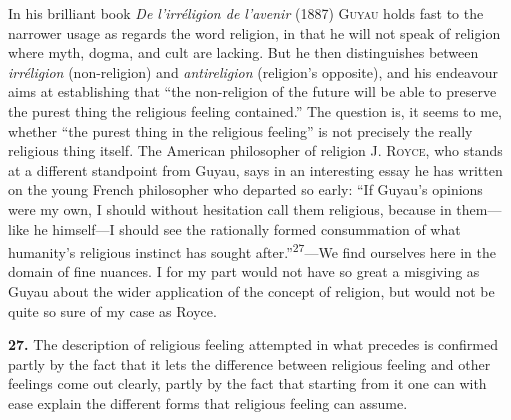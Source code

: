 \documentclass[12pt,a4paper]{book}
\newcommand{\opage}[1]{\marginnote{\footnotesize\textit{[#1]}}}
\begin{document}
In his brilliant book \emph{De l'irréligion de l'avenir} (1887) \textsc{Guyau}
holds fast to the narrower usage as regards the word religion, in that he will
not speak of religion where myth, dogma, and cult are lacking. But he then
distinguishes between \emph{irréligion} (non-religion) and \emph{antireligion}
(religion's opposite), and his endeavour aims at establishing that ``the
non-religion of the future will be able to preserve the purest thing the
religious feeling contained.'' The question is, it seems to me, whether ``the
purest thing in the religious feeling'' is not precisely the really religious
thing itself. The American philosopher of religion \textsc{J. Royce}, who
stands at a different standpoint from Guyau, says in an interesting essay he
has written on the young French philosopher who departed so early: ``If Guyau's
opinions were my own, I should without hesitation call them religious, because
in them---like he himself---I should see the rationally formed consummation of
what humanity's religious instinct has sought after.''\textsuperscript{27}---We
find ourselves here in the domain of fine nuances. I for my part would not have
so great a misgiving as Guyau about the wider application of the concept of
religion, but would not be quite so sure of my case as Royce.

\medskip

\noindent
\opage{66}\textbf{27.} The description of religious feeling attempted in what
precedes is confirmed partly by the fact that it lets the difference between
religious feeling and other feelings come out clearly, partly by the fact that
starting from it one can with ease explain the different forms that religious
feeling can assume.
\end{document}
